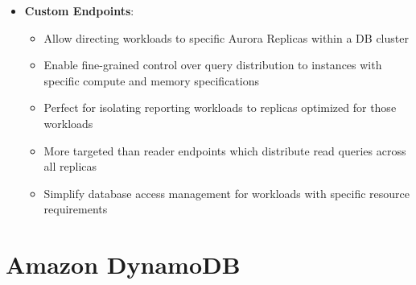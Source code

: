 \documentclass[11pt,a4paper]{report}
\begin{document}
\begin{itemize}
  \item \textbf{Custom Endpoints}:
\begin{itemize}
  \item Allow directing workloads to specific Aurora Replicas within a DB cluster
  \item Enable fine-grained control over query distribution to instances with specific compute and memory specifications
  \item Perfect for isolating reporting workloads to replicas optimized for those workloads
  \item More targeted than reader endpoints which distribute read queries across all replicas
  \item Simplify database access management for workloads with specific resource requirements
\end{itemize}
\end{itemize}


\section{Amazon DynamoDB}
\end{document}
